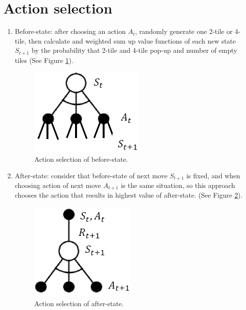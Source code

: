 \section{Action selection}
\begin{enumerate}
	\item Before-state: after choosing an action $A_t$, randomly generate one 2-tile or 4-tile, then
	calculate and weighted sum up value functions of each new state $S_{t + 1}$ 
	by the probability that 2-tile and 4-tile pop-up and number of empty tiles
	(See Figure \ref{action-selection-before-state}).
	\begin{figure}[H]
		\centering
		\includegraphics[scale=0.5]{img/action-selection-before-state.png}
		\caption{Action selection of before-state.}
		\label{action-selection-before-state}
	\end{figure}
	\item After-state: consider that before-state of next move $S_{t + 1}$ is fixed, and 
	when choosing action of next move $A_{t + 1}$ is the same situation, so this approach 
	chooses the action that results in highest value of after-state.
	(See Figure \ref{action-selection-after-state}).
	\begin{figure}[H]
		\centering
		\includegraphics[scale=0.5]{img/action-selection-after-state.png}
		\caption{Action selection of after-state.}
		\label{action-selection-after-state}
	\end{figure}
\end{enumerate}

